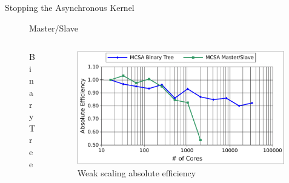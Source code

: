 \documentclass{beamer}
\begin{document}
\begin{frame}{Stopping the Asynchronous Kernel}

  \vspace{-0.25in}

  \begin{figure}[htpb!]
    \begin{center}
      \scalebox{0.4}{  }
    \end{center}
    \caption{Master/Slave}
  \end{figure}

  \begin{columns}

    \begin{column}{0.5\textwidth}
      \vspace{-0.75in}
      \begin{figure}[htpb!]
        \begin{center}
          \scalebox{0.4}{  }
        \end{center}
        \caption{Binary Tree}
      \end{figure}

    \end{column}

    \begin{column}{0.5\textwidth}

      \vspace{-0.5in}
      
      \begin{figure}[t!]
        \begin{center}
          \includegraphics[width=0.99\textwidth]{titan_weak_bvsm.pdf}
        \end{center}
        \caption{Weak scaling absolute efficiency}
        \label{fig:titan_weak_bvsm}
      \end{figure}

    \end{column}

  \end{columns}

\end{frame}
\end{document}
